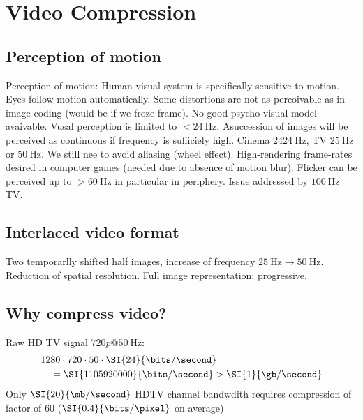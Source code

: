 \chapter{Video Compression}
\section{Perception of motion}
Perception of motion: Human visual system is specifically sensitive to motion. Eyes follow motion automatically. Some distortions are not as percoivable as in image coding (would be if we froze frame). No good psycho-visual model avaivable. Vusal perception is limited to $<\SI{24}{\hertz}$. Asuccession of images will be perceived as continuous if frequency is sufficiely high. Cinema $24\SI{24}{\hertz}$, TV $\SI{25}{\hertz}$ or $\SI{50}{\hertz}$. We still nee to avoid aliasing (wheel effect). High-rendering frame-rates desired in computer games (needed due to absence of motion blur). Flicker can be perceived up to $>\SI{60}{\hertz}$ in particular in periphery. Issue addressed by $\SI{100}{\hertz}$ TV.
\section{Interlaced video format}
Two temporarlly shifted half images, increase of frequency $\SI{25}{\hertz}\to\SI{50}{\hertz}$. Reduction of spatial resolution. Full image representation: progressive.
\section{Why compress video?}
Raw HD TV signal $720p@\SI{50}{\hertz}$:
\begin{align*}
	&1280\cdot720\cdot50\cdot\SI{24}{\bits/\second}\\
	&\quad=\SI{1105920000}{\bits/\second}>\SI{1}{\gb/\second}
\end{align*}
Only $\SI{20}{\mb/\second}$ HDTV channel bandwdith requires compression of factor of $60$ ($\SI{0.4}{\bits/\pixel}$ on average)
